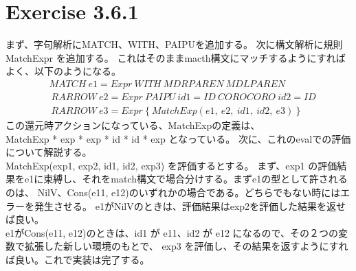 \documentclass{jreport}
\begin{document}
\section{Exercise 3.6.1}
まず、字句解析にMATCH、WITH、PAIPUを追加する。
次に構文解析に規則 MatchExpr を追加する。
これはそのままmacth構文にマッチするようにすればよく、以下のようになる。
\begin{equation}
  \begin{split}
    &MATCH \ e1=Expr \ WITH \ MDRPAREN \ MDLPAREN \\ &
    \ RARROW \ e2=Expr \ PAIPU \ id1=ID \ COROCORO \ id2=ID \\ & \
    RARROW \ e3=Expr \ \{ \ MatchExp(e1, \ e2, \ id1, \ id2, \ e3) \ \}
  \end{split}
\end{equation}
この還元時アクションになっている、MatchExpの定義は、\\
MatchExp * exp * exp * id * id * exp となっている。
次に、これのevalでの評価について解説する。\\
MatchExp(exp1, exp2, id1, id2, exp3) を評価するとする。
まず、exp1 の評価結果をe1に束縛し、それをmatch構文で場合分けする。まずe1の型として許されるのは、
NilV、Cons(e11, e12)のいずれかの場合である。どちらでもない時にはエラーを発生させる。
e1がNilVのときは、評価結果はexp2を評価した結果を返せば良い。\\
e1がCons(e11, e12)のときは、id1 が e11、id2 が e12 になるので、その２つの変数で拡張した新しい環境のもとで、
exp3 を評価し、その結果を返すようにすれば良い。これで実装は完了する。
\end{document}
